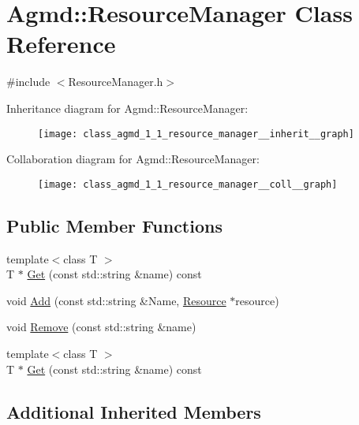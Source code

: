 \hypertarget{class_agmd_1_1_resource_manager}{\section{Agmd\+:\+:Resource\+Manager Class Reference}
\label{class_agmd_1_1_resource_manager}
}


{\ttfamily \#include $<$Resource\+Manager.\+h$>$}



Inheritance diagram for Agmd\+:\+:Resource\+Manager\+:\nopagebreak
\begin{figure}[H]
\begin{center}
\leavevmode
\texttt{[image: class\_agmd\_1\_1\_resource\_manager\_\_inherit\_\_graph]}
\end{center}
\end{figure}


Collaboration diagram for Agmd\+:\+:Resource\+Manager\+:\nopagebreak
\begin{figure}[H]
\begin{center}
\leavevmode
\texttt{[image: class\_agmd\_1\_1\_resource\_manager\_\_coll\_\_graph]}
\end{center}
\end{figure}
\subsection*{Public Member Functions}
\begin{DoxyCompactItemize}
\item 
{\footnotesize template$<$class T $>$ }\\T $\ast$ \hyperlink{class_agmd_1_1_resource_manager_a65c6954a3b27b8063db15a0e4a6e2961}{Get} (const std\+::string \&name) const 
\item 
void \hyperlink{class_agmd_1_1_resource_manager_aa44090dde0e49fd81cc8b441b2efcbb0}{Add} (const std\+::string \&Name, \hyperlink{class_agmd_1_1_resource}{Resource} $\ast$resource)
\item 
void \hyperlink{class_agmd_1_1_resource_manager_a8f359ed7f1782fd8ca010544c60af235}{Remove} (const std\+::string \&name)
\item 
{\footnotesize template$<$class T $>$ }\\T $\ast$ \hyperlink{class_agmd_1_1_resource_manager_a63378f2bc8397d64df3dcfaad103b620}{Get} (const std\+::string \&name) const 
\end{DoxyCompactItemize}
\subsection*{Additional Inherited Members}


